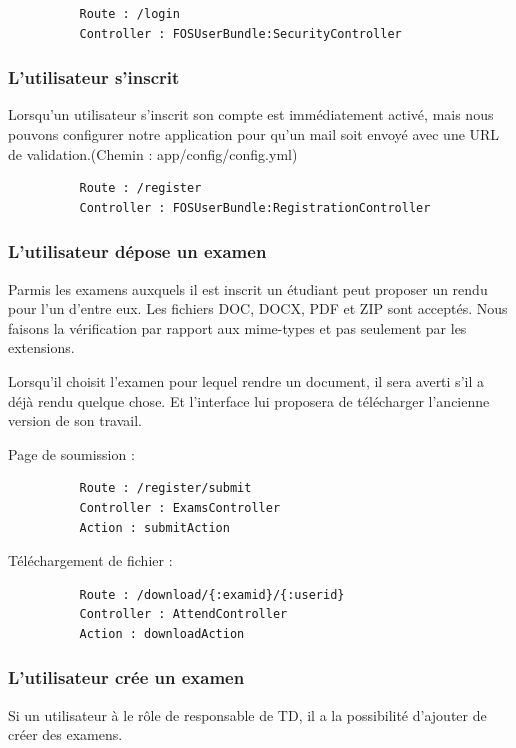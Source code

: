 \documentclass{report}
\begin{document}
        \begin{verbatim}
          Route : /login 
          Controller : FOSUserBundle:SecurityController
        \end{verbatim}
      \subsubsection{L'utilisateur s'inscrit}
        Lorsqu'un utilisateur s'inscrit son compte est immédiatement activé, mais nous
        pouvons configurer notre application pour qu'un mail soit envoyé avec une URL de
        validation.(Chemin : app/config/config.yml)
        
        \begin{verbatim}
          Route : /register 
          Controller : FOSUserBundle:RegistrationController  
        \end{verbatim}
      \subsubsection{L'utilisateur dépose un examen}
        Parmis les examens auxquels il est inscrit un étudiant peut proposer un rendu pour
        l'un d'entre eux. Les fichiers DOC, DOCX, PDF et ZIP sont acceptés. Nous faisons
        la vérification par rapport aux mime-types et pas seulement par les extensions.

        Lorsqu'il choisit l'examen pour lequel rendre un document, il sera averti s'il a
        déjà rendu quelque chose. Et l'interface lui proposera de télécharger l'ancienne
        version de son travail.

        Page de soumission :
        \begin{verbatim}
          Route : /register/submit
          Controller : ExamsController
          Action : submitAction
        \end{verbatim}
        Téléchargement de fichier :
        \begin{verbatim}
          Route : /download/{:examid}/{:userid}
          Controller : AttendController
          Action : downloadAction
        \end{verbatim}
      \subsubsection{L'utilisateur crée un examen}
        Si un utilisateur à le rôle de responsable de TD, il a la possibilité d'ajouter
        de créer des examens.
        
\end{document}
